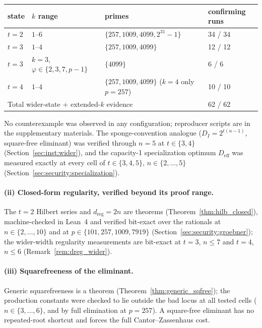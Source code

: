 \documentclass[11pt,a4paper]{article}
\theoremstyle{definition}
\begin{document}
\smallskip
\begin{center}
\begin{tabular}{l@{\quad}l@{\quad}l@{\quad}l}
\toprule
state & $k$ range & primes & confirming runs \\
\midrule
$t=2$ & $1$--$6$ & $\{257,1009,4099,2^{31}{-}1\}$ & 34 / 34 \\
$t=3$ & $1$--$4$ & $\{257,1009,4099\}$            & 12 / 12 \\
$t=3$ & $k=3$, $\varphi\in\{2,3,7,p{-}1\}$ & $\{4099\}$ & 6 / 6 \\
$t=4$ & $1$--$4$ & $\{257,1009,4099\}$ ($k\!=\!4$ only $p\!=\!257$) & 10 / 10 \\
\midrule
\multicolumn{3}{l}{Total wider-state + extended-$k$ evidence} & 62 / 62 \\
\bottomrule
\end{tabular}
\end{center}
\smallskip

\noindent
No counterexample was observed in any configuration; reproducer
scripts are in the supplementary materials. The sponge-convention
analogue ($D_I = 2^{t(n-1)}$, square-free eliminant) was verified
through $n = 5$ at $t \in \{3,4\}$
(Section~\ref{sec:inst:wider}), and the capacity-1 specialization
optimum $D_{\mathrm{eff}}$ was measured exactly at every cell of
$t \in \{3,4,5\}$, $n \in \{2,\ldots,5\}$
(Section~\ref{sec:security:specialization}).

\paragraph{(ii) Closed-form regularity, verified beyond its proof range.}
The $t=2$ Hilbert series and $d_{\mathrm{reg}} = 2n$ are theorems
(Theorem~\ref{thm:hilb_closed}), machine-checked in Lean~4 and
verified bit-exact over the rationals at $n \in \{2,\ldots,10\}$ and
at $p \in \{101, 257, 1009, 7919\}$
(Section~\ref{sec:security:groebner}); the wider-width regularity
measurements are bit-exact at $t=3$, $n \le 7$ and $t=4$, $n \le 6$
(Remark~\ref{rem:dreg_wider}).

\paragraph{(iii) Squarefreeness of the eliminant.}
Generic squarefreeness is a theorem
(Theorem~\ref{thm:generic_sqfree}); the production constants were
checked to lie outside the bad locus at all tested cells
($n \in \{3,\ldots,6\}$, and by full elimination at $p = 257$). A
square-free eliminant has no repeated-root shortcut and forces the
full Cantor--Zassenhaus cost.
\end{document}
